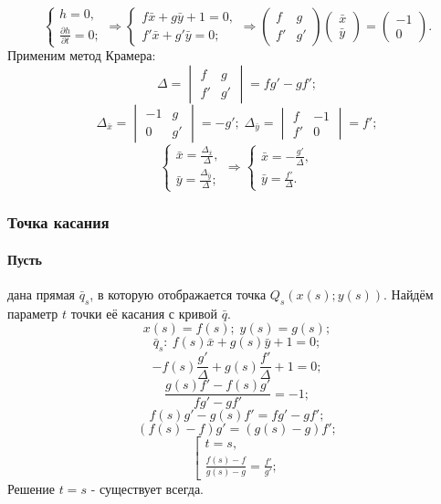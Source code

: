 $$
\left\{
\begin{gathered}
	h = 0, \\
	\frac{\partial h}{\partial t} = 0;
\end{gathered}
\right.
\Rightarrow
\left\{
\begin{gathered}
	f\bar{x} + g\bar{y} + 1 = 0, \\
	f'\bar{x} + g'\bar{y} = 0;
\end{gathered}
\right.
\Rightarrow
\begin{pmatrix}
	f & g \\
	f' & g'
\end{pmatrix}
\begin{pmatrix}
	\bar{x} \\
	\bar{y}
\end{pmatrix}
=
\begin{pmatrix}
	-1 \\
	0
\end{pmatrix}.
$$
Применим метод Крамера:
$$\Delta = 
\begin{vmatrix}
	f & g \\
	f' & g'
\end{vmatrix}
= f g' - g f';
$$
$$\Delta_{\bar{x}} = 
\begin{vmatrix}
	-1 & g \\
	0 & g'
\end{vmatrix}
= - g';
\;
\Delta_{\bar{y}} = 
\begin{vmatrix}
	f & -1 \\
	f' & 0
\end{vmatrix}
= f';
$$
$$
\left\{
\begin{gathered}
	\bar{x} = \frac{\Delta_{\bar{x}}}{\Delta},\\
	\bar{y} = \frac{\Delta_{\bar{y}}}{\Delta};
\end{gathered}
\right.
\Rightarrow
\left\{
\begin{gathered}
	\bar{x} = -\frac{g'}{\Delta},\\
	\bar{y} = \frac{f'}{\Delta}.
\end{gathered}
\right.
$$

\subsubsection{Точка касания}
\paragraph{Пусть} дана прямая $\bar{q}_s$, в которую отображается точка $Q_s (x(s); y(s))$. Найдём параметр $t$ точки её касания с кривой $\bar{q}$.
$$x(s) = f(s);\; y(s)= g(s);$$
$$\bar{q}_s: \: f(s)\bar{x} + g(s)\bar{y} + 1 = 0;$$
$$-f(s)\frac{g'}{\Delta} + g(s)\frac{f'}{\Delta} + 1 = 0;$$
$$\frac{g(s) f' - f(s) g'}{f g' - g f'} = -1;$$
$$f(s) g' - g(s) f' = f g' - g f';$$
$$(f(s) - f) g' = (g(s) - g) f';$$
$$\left[
\begin{gathered}
	t = s,\\
	\frac{f(s) - f}{g(s) - g} = \frac{f'}{g'};
\end{gathered}
\right.
$$
Решение $t = s$ - существует всегда.

